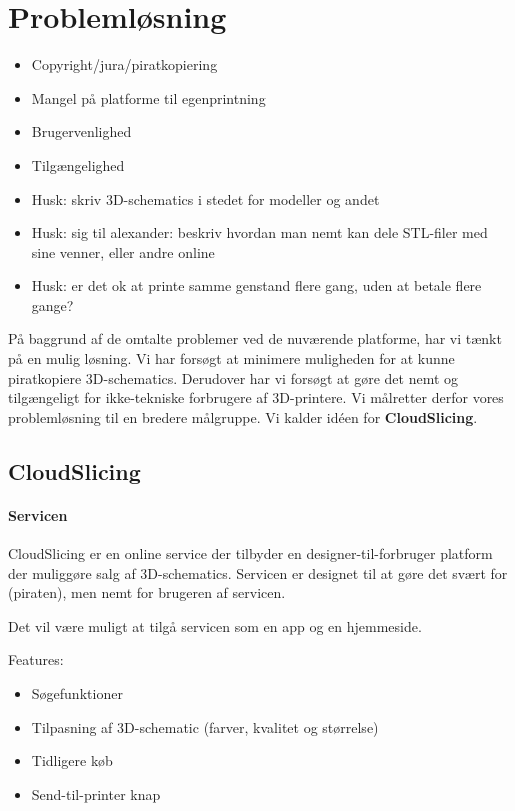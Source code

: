 \chapter{Problemløsning} %
\label{cha:probleml_sning}

\begin{itemize}
	\item Copyright/jura/piratkopiering
	\item Mangel på platforme til egenprintning
	\item Brugervenlighed
	\item Tilgængelighed
	\item Husk: skriv 3D-schematics i stedet for modeller og andet
	\item Husk: sig til alexander: beskriv hvordan man nemt kan dele STL-filer med sine venner, eller andre online
	\item Husk: er det ok at printe samme genstand flere gang, uden at betale flere gange?
\end{itemize}

På baggrund af de omtalte problemer ved de nuværende platforme, har vi tænkt på en mulig løsning. Vi har forsøgt at minimere muligheden for at kunne piratkopiere 3D-schematics. Derudover har vi forsøgt at gøre det nemt og tilgængeligt for ikke-tekniske forbrugere af 3D-printere. Vi målretter derfor vores problemløsning til en bredere målgruppe. Vi kalder idéen for \textbf{CloudSlicing}. 

\section{CloudSlicing} %
\label{sec:cloudslicing}

\subsubsection{Servicen} %
\label{ssub:servicen}

CloudSlicing er en online service der tilbyder en designer-til-forbruger platform der muliggøre salg af 3D-schematics. Servicen er designet til at gøre det svært for (piraten), men nemt for brugeren af servicen.

Det vil være muligt at tilgå servicen som en app og en hjemmeside.

Features:

\begin{itemize}
	\item Søgefunktioner
	\item Tilpasning af 3D-schematic (farver, kvalitet og størrelse)
	\item Tidligere køb
	\item Send-til-printer knap
\end{itemize}


